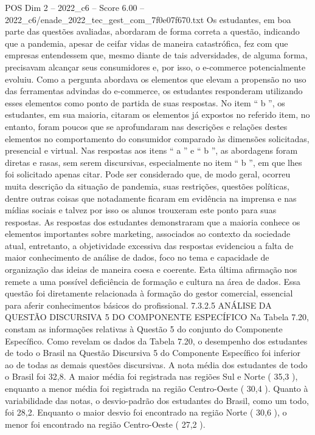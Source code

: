 \begin{textsample}{POS Dim 2 – 2022\_c6 – Score 6.00 – 2022\_c6/enade\_2022\_tec\_gest\_com\_7f0e07f670.txt}
Os estudantes, em boa parte das questões avaliadas, abordaram de forma correta a questão, indicando que a pandemia, apesar de ceifar vidas de maneira catastrófica, fez com que empresas entendessem que, mesmo diante de tais adversidades, de alguma forma, precisavam alcançar seus consumidores e, por isso, o e-commerce potencialmente evoluiu.
Como a pergunta abordava os elementos que elevam a propensão no uso das ferramentas advindas do e-commerce, os estudantes responderam utilizando esses elementos como ponto de partida de suas respostas.
No item “ b ”, os estudantes, em sua maioria, citaram os elementos já expostos no referido item, no entanto, foram poucos que se aprofundaram nas descrições e relações destes elementos no comportamento do consumidor comparado às dimensões solicitadas, presencial e virtual.
Nas respostas aos itens “ a ” e “ b ”, as abordagens foram diretas e rasas, sem serem discursivas, especialmente no item “ b ”, em que lhes foi solicitado apenas citar.
Pode ser considerado que, de modo geral, ocorreu muita descrição da situação de pandemia, suas restrições, questões políticas, dentre outras coisas que notadamente ficaram em evidência na imprensa e nas mídias sociais e talvez por isso os alunos trouxeram este ponto para suas respostas.
As respostas dos estudantes demonstraram que a maioria conhece os elementos importantes sobre marketing, associados ao contexto da sociedade atual, entretanto, a objetividade excessiva das respostas evidenciou a falta de maior conhecimento de análise de dados, foco no tema e capacidade de organização das ideias de maneira coesa e coerente.
Esta última afirmação nos remete a uma possível deficiência de formação e cultura na área de dados.
Essa questão foi diretamente relacionada à formação do gestor comercial, essencial para aferir conhecimentos básicos do profissional. 7.3.2.5 ANÁLISE DA QUESTÃO DISCURSIVA 5 DO COMPONENTE ESPECÍFICO Na Tabela 7.20, constam as informações relativas à Questão 5 do conjunto do Componente Específico.
Como revelam os dados da Tabela 7.20, o desempenho dos estudantes de todo o Brasil na Questão Discursiva 5 do Componente Específico foi inferior ao de todas as demais questões discursivas.
A nota média dos estudantes de todo o Brasil foi 32,8.
A maior média foi registrada nas regiões Sul e Norte ( 35,3 ), enquanto a menor média foi registrada na região Centro-Oeste ( 30,4 ).
Quanto à variabilidade das notas, o desvio-padrão dos estudantes do Brasil, como um todo, foi 28,2.
Enquanto o maior desvio foi encontrado na região Norte ( 30,6 ), o menor foi encontrado na região Centro-Oeste ( 27,2 ).

\end{textsample}
